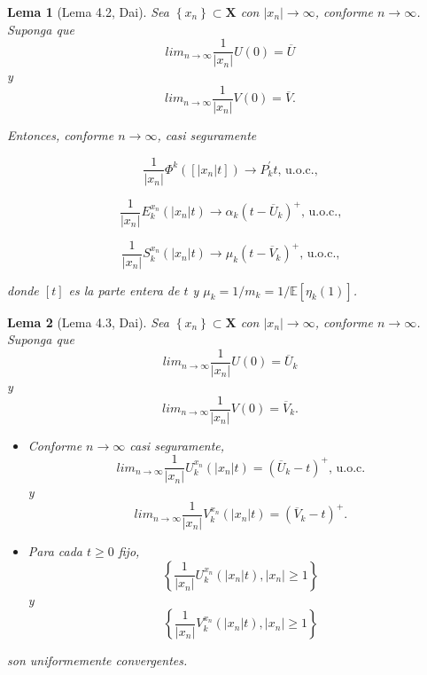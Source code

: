 \documentclass{article}
\newtheorem{Lema}{Lema}
\newcommand{\esp}{\mathbb{E}}
\begin{document}
\begin{Lema}[Lema 4.2, Dai\cite{Dai}]\label{Lema4.2}
Sea $\left\{x_{n}\right\}\subset \mathbf{X}$ con
$|x_{n}|\rightarrow\infty$, conforme $n\rightarrow\infty$. Suponga
que
\[lim_{n\rightarrow\infty}\frac{1}{|x_{n}|}U\left(0\right)=\overline{U}\]
y
\[lim_{n\rightarrow\infty}\frac{1}{|x_{n}|}V\left(0\right)=\overline{V}.\]

Entonces, conforme $n\rightarrow\infty$, casi seguramente

\begin{equation}\label{E1.4.2}
\frac{1}{|x_{n}|}\Phi^{k}\left(\left[|x_{n}|t\right]\right)\rightarrow
P_{k}^{'}t\textrm{, u.o.c.,}
\end{equation}

\begin{equation}\label{E1.4.3}
\frac{1}{|x_{n}|}E^{x_{n}}_{k}\left(|x_{n}|t\right)\rightarrow
\alpha_{k}\left(t-\overline{U}_{k}\right)^{+}\textrm{, u.o.c.,}
\end{equation}

\begin{equation}\label{E1.4.4}
\frac{1}{|x_{n}|}S^{x_{n}}_{k}\left(|x_{n}|t\right)\rightarrow
\mu_{k}\left(t-\overline{V}_{k}\right)^{+}\textrm{, u.o.c.,}
\end{equation}

donde $\left[t\right]$ es la parte entera de $t$ y
$\mu_{k}=1/m_{k}=1/\esp\left[\eta_{k}\left(1\right)\right]$.
\end{Lema}

\begin{Lema}[Lema 4.3, Dai\cite{Dai}]\label{Lema.4.3}
Sea $\left\{x_{n}\right\}\subset \mathbf{X}$ con
$|x_{n}|\rightarrow\infty$, conforme $n\rightarrow\infty$. Suponga
que
\[lim_{n\rightarrow\infty}\frac{1}{|x_{n}|}U\left(0\right)=\overline{U}_{k}\]
y
\[lim_{n\rightarrow\infty}\frac{1}{|x_{n}|}V\left(0\right)=\overline{V}_{k}.\]
\begin{itemize}
\item[a)] Conforme $n\rightarrow\infty$ casi seguramente,
\[lim_{n\rightarrow\infty}\frac{1}{|x_{n}|}U^{x_{n}}_{k}\left(|x_{n}|t\right)=\left(\overline{U}_{k}-t\right)^{+}\textrm{, u.o.c.}\]
y
\[lim_{n\rightarrow\infty}\frac{1}{|x_{n}|}V^{x_{n}}_{k}\left(|x_{n}|t\right)=\left(\overline{V}_{k}-t\right)^{+}.\]

\item[b)] Para cada $t\geq0$ fijo,
\[\left\{\frac{1}{|x_{n}|}U^{x_{n}}_{k}\left(|x_{n}|t\right),|x_{n}|\geq1\right\}\]
y
\[\left\{\frac{1}{|x_{n}|}V^{x_{n}}_{k}\left(|x_{n}|t\right),|x_{n}|\geq1\right\}\]
\end{itemize}
son uniformemente convergentes.
\end{Lema}
\end{document}
